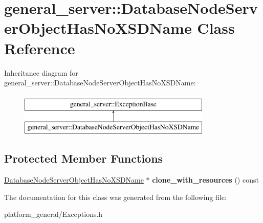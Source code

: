 \hypertarget{classgeneral__server_1_1DatabaseNodeServerObjectHasNoXSDName}{\section{general\-\_\-server\-:\-:\-Database\-Node\-Server\-Object\-Has\-No\-X\-S\-D\-Name \-Class \-Reference}
\label{classgeneral__server_1_1DatabaseNodeServerObjectHasNoXSDName}
}
\-Inheritance diagram for general\-\_\-server\-:\-:\-Database\-Node\-Server\-Object\-Has\-No\-X\-S\-D\-Name\-:\begin{figure}[H]
\begin{center}
\leavevmode
\includegraphics[height=2.000000cm]{classgeneral__server_1_1DatabaseNodeServerObjectHasNoXSDName}
\end{center}
\end{figure}
\subsection*{\-Protected \-Member \-Functions}
\begin{DoxyCompactItemize}
\item 
\hypertarget{classgeneral__server_1_1DatabaseNodeServerObjectHasNoXSDName_af0323fc85cb8ded0738c7d0e206d95cc}{\hyperlink{classgeneral__server_1_1DatabaseNodeServerObjectHasNoXSDName}{\-Database\-Node\-Server\-Object\-Has\-No\-X\-S\-D\-Name} $\ast$ {\bfseries clone\-\_\-with\-\_\-resources} () const }\label{classgeneral__server_1_1DatabaseNodeServerObjectHasNoXSDName_af0323fc85cb8ded0738c7d0e206d95cc}

\end{DoxyCompactItemize}


\-The documentation for this class was generated from the following file\-:\begin{DoxyCompactItemize}
\item 
platform\-\_\-general/\-Exceptions.\-h\end{DoxyCompactItemize}
